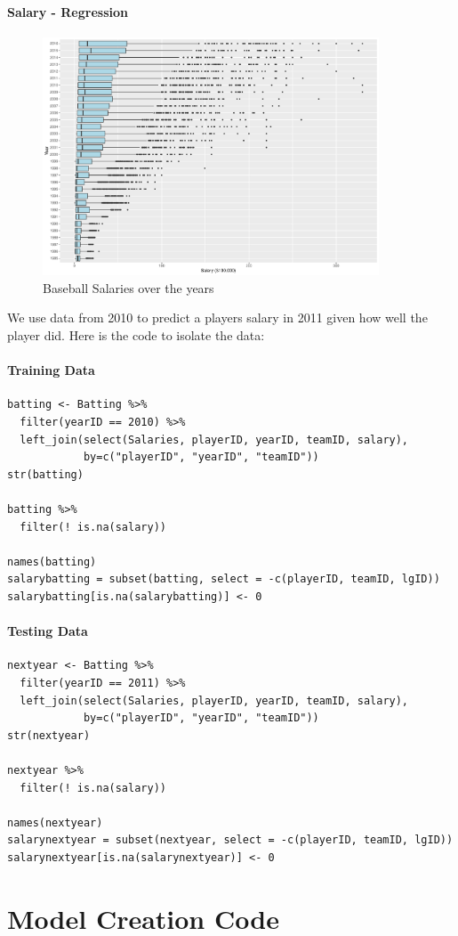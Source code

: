 \documentclass[11pt,a4paper]{report}
\begin{document}
\begin{appendices}
\subsubsection{Salary - Regression}
\begin{figure}
    \centering
    \includegraphics[width=10cm]{photographs/Salaries.pdf}
    \caption{Baseball Salaries over the years}
    \label{fig:Salary}
\end{figure}
We use data from 2010 to predict a players salary in 2011 given how well the player did. Here is the code to isolate the data:
\subsubsection{Training Data}
\begin{verbatim}
batting <- Batting %>%
  filter(yearID == 2010) %>%
  left_join(select(Salaries, playerID, yearID, teamID, salary), 
            by=c("playerID", "yearID", "teamID"))
str(batting)

batting %>%
  filter(! is.na(salary))

names(batting)
salarybatting = subset(batting, select = -c(playerID, teamID, lgID))
salarybatting[is.na(salarybatting)] <- 0
\end{verbatim}

\subsubsection{Testing Data}
\begin{verbatim}
nextyear <- Batting %>%
  filter(yearID == 2011) %>%
  left_join(select(Salaries, playerID, yearID, teamID, salary), 
            by=c("playerID", "yearID", "teamID"))
str(nextyear)

nextyear %>%
  filter(! is.na(salary))

names(nextyear)
salarynextyear = subset(nextyear, select = -c(playerID, teamID, lgID))
salarynextyear[is.na(salarynextyear)] <- 0
\end{verbatim}

\chapter{Model Creation Code}


\end{appendices}
\end{document}
